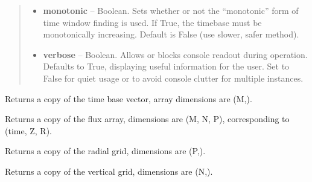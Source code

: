 \documentclass[letterpaper,10pt,english]{sphinxmanual}
\begin{document}
\begin{fulllineitems}
\begin{quote}
\begin{description}
\begin{itemize}
\item {} 
\textbf{monotonic} -- Boolean.
Sets whether or not the ``monotonic'' form of time window
finding is used. If True, the timebase must be monotonically
increasing. Default is False (use slower, safer method).

\item {} 
\textbf{verbose} -- Boolean.
Allows or blocks console readout during operation.  Defaults to True,
displaying useful information for the user.  Set to False for quiet
usage or to avoid console clutter for multiple instances.

\end{itemize}

\end{description}\end{quote}

\begin{fulllineitems}
\label{eqtools:eqtools.FromArrays.ArrayEquilibrium.getTimeBase}
Returns a copy of the time base vector, array dimensions are (M,).

\end{fulllineitems}


\begin{fulllineitems}
\label{eqtools:eqtools.FromArrays.ArrayEquilibrium.getFluxGrid}
Returns a copy of the flux array, dimensions are (M, N, P), corresponding to (time, Z, R).

\end{fulllineitems}


\begin{fulllineitems}
\label{eqtools:eqtools.FromArrays.ArrayEquilibrium.getRGrid}
Returns a copy of the radial grid, dimensions are (P,).

\end{fulllineitems}


\begin{fulllineitems}
\label{eqtools:eqtools.FromArrays.ArrayEquilibrium.getZGrid}
Returns a copy of the vertical grid, dimensions are (N,).


\end{fulllineitems}
\end{fulllineitems}
\end{document}
